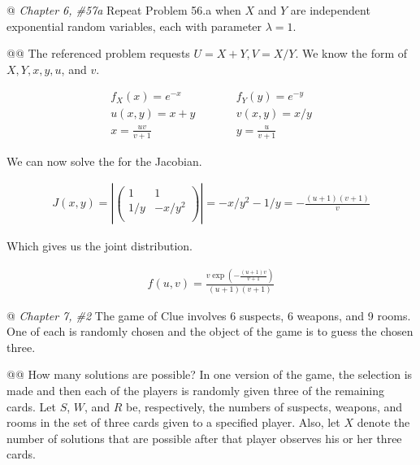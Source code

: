 \documentclass[11pt]{article}\usepackage[]{graphicx}\usepackage[]{xcolor}
\begin{document}
\begin{easylist}[enumerate]
    @ \textit{Chapter 6, \#57a} Repeat Problem 56.a when $X$ and $Y$ are independent exponential random variables, each
    with parameter $\lambda = 1$.

    @@ The referenced problem requests $U = X + Y, V = X/Y$. We know the form of $X, Y, x, y, u$, and $v$.

    \begin{equation}
        \begin{aligned}
            f_X(x) = e^{-x} &\qquad& f_Y(y) = e^{-y}\\
            u(x,y) = x + y &\qquad& v(x, y) = x/y\\
            x = \frac{uv}{v+1} &\qquad& y = \frac{u}{v+1}
        \end{aligned}
    \end{equation}

    We can now solve the for the Jacobian.

    \begin{equation}
        \begin{aligned}
            J(x, y) = \left| \begin{pmatrix}
                                 1 & 1\\
                                 1/y & -x/y^2\\
                             \end{pmatrix}
                      \right| = -x/y^2 - 1/y = -\frac{(u+1) (v+1)}{v}
        \end{aligned}
    \end{equation}

    Which gives us the joint distribution.

    \begin{equation}
        \begin{aligned}
            f(u, v) = \frac{v \exp\left({-\frac{(u+1) v}{v+1}}\right)}{(u+1) (v+1)}
        \end{aligned}
    \end{equation}

    @ \textit{Chapter 7, \#2} The game of Clue involves 6 suspects, 6 weapons, and 9 rooms. One of each is randomly
    chosen and the object of the game is to guess the chosen three.

    @@ How many solutions are possible? In one version of the game, the selection is made and then each of the players
    is randomly given three of the remaining cards. Let $S$, $W$, and $R$ be, respectively, the numbers of suspects,
    weapons, and rooms in the set of three cards given to a specified player. Also, let $X$ denote the number of
    solutions that are possible after that player observes his or her three cards.


\end{easylist}
\end{document}
